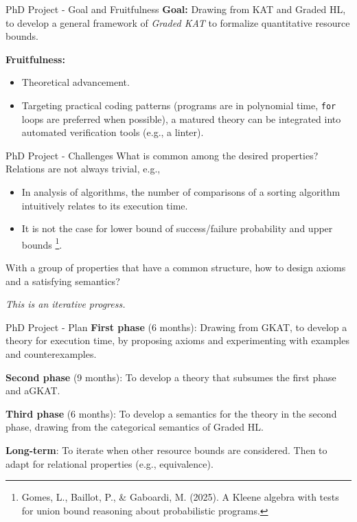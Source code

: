 \documentclass[xcolor=dvipsnames, aspectratio=169, 10pt]{beamer}
\begin{document}
\begin{frame}{PhD Project - Goal and Fruitfulness}
  \textbf{Goal:} Drawing from KAT and Graded HL, to develop a general framework of \textit{Graded KAT} to formalize quantitative resource bounds.

  \vspace{0.5cm}

  \textbf{Fruitfulness:}
  \begin{itemize}
    \item Theoretical advancement.
    \item Targeting practical coding patterns (programs are in polynomial time, \texttt{for} loops are preferred when possible), a matured theory can be integrated into automated verification tools (e.g., a linter).
  \end{itemize}
\end{frame}

\begin{frame}{PhD Project - Challenges}
  What is common among the desired properties? Relations are not always trivial, e.g.,
  \begin{itemize}
    \item In analysis of algorithms, the number of comparisons of a sorting algorithm intuitively relates to its execution time.
    \item It is not the case for lower bound of success/failure probability and upper bounds \footnote{Gomes, L., Baillot, P., \& Gaboardi, M. (2025). A Kleene algebra with tests for union bound reasoning about probabilistic programs.}.
  \end{itemize}

  With a group of properties that have a common structure, how to design axioms and a satisfying semantics?

  \textit{This is an iterative progress.}


\end{frame}

\begin{frame}{PhD Project - Plan}
  \textbf{First phase} (6 months): Drawing from GKAT, to develop a theory for execution time, by proposing axioms and experimenting with examples and counterexamples.

  \textbf{Second phase} (9 months): To develop a theory that subsumes the first phase and aGKAT.

  \textbf{Third phase} (6 months): To develop a semantics for the theory in the second phase, drawing from the categorical semantics of Graded HL.

  \textbf{Long-term}: To iterate when other resource bounds are considered. Then to adapt for relational properties (e.g., equivalence).
\end{frame}
\end{document}
